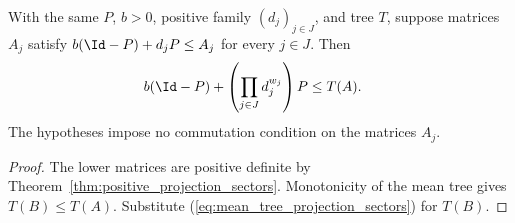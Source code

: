 \begin{theorem}
\label{thm:mean_tree_projection_sector_lower_bound}
\leanok
{}
With the same $P$, $b>0$, positive family $(d_j)_{j\in J}$, and tree $T$,
suppose matrices $A_j$ satisfy $b(\Id-P)+d_jP\le A_j$ for every $j\in J$.
Then
\begin{align}
 b(\Id-P)+\left(\prod_{j\in J}d_j^{w_j}\right)P&\le T(A).\notag
\end{align}
The hypotheses impose no commutation condition on the matrices $A_j$.
\end{theorem}
\begin{proof}
\leanok
{}
The lower matrices are positive definite by
Theorem~\ref{thm:positive_projection_sectors}. Monotonicity of the mean
tree gives $T(B)\le T(A)$. Substitute
(\ref{eq:mean_tree_projection_sectors}) for $T(B)$.
\end{proof}
